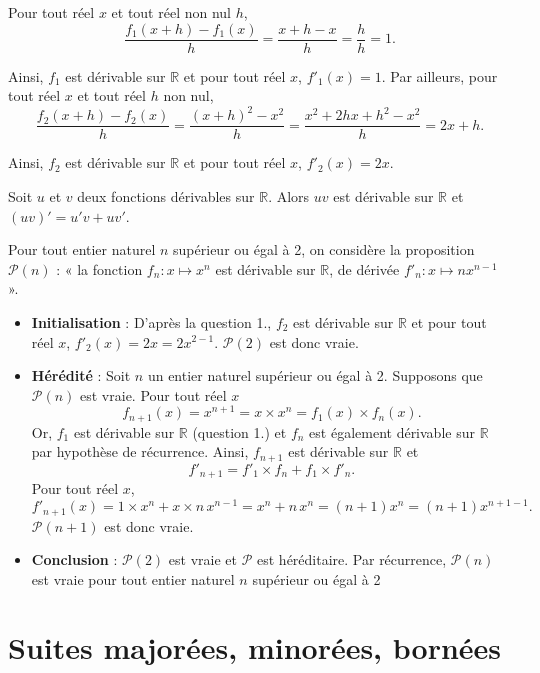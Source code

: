 \documentclass[11pt,fleqn]{book} %
\begin{document}
\begin{solution} Pour tout réel \(x\) et tout réel non nul \(h\),
\[ \dfrac{f_1(x+h) - f_1(x)}{h}=\dfrac{x+h-x}{h} = \dfrac{h}{h}=1.\]

Ainsi, \(f_1\) est dérivable sur \(\mathbb{R}\) et pour tout réel \(x\), \(f'_1(x)=1\). Par ailleurs, pour tout réel \(x\) et tout réel \(h\) non nul,
\[\dfrac{f_2(x+h)-f_2(x)}{h}=\dfrac{(x+h)^2-x^2}{h}=\dfrac{x^2+2hx+h^2-x^2}{h}=2x+h.\]

Ainsi, \(f_2\) est dérivable sur \(\mathbb{R}\) et pour tout réel \(x\), \(f'_2(x)=2x\).

Soit \(u\) et \(v\) deux fonctions dérivables sur \(\mathbb{R}\). Alors \(uv\) est dérivable sur \(\mathbb{R}\) et \((uv)'=u'v+uv'\).

Pour tout entier naturel \(n\) supérieur ou égal à 2, on considère la proposition \( \mathcal{P}(n)\) : « la fonction \(f_n : x \mapsto x^n\) est dérivable sur \(\mathbb{R}\), de dérivée \(f'_n : x \mapsto nx^{n-1}\) ».
\begin{itemize} \item \textbf{Initialisation} : D'après la question 1., \(f_2\) est dérivable sur \(\mathbb{R}\) et pour tout réel \(x\), \(f'_2(x)=2x=2x^{2-1}\). \(\mathcal{P}(2)\) est donc vraie.
\item \textbf{Hérédité} : Soit \(n\) un entier naturel supérieur ou égal à 2. Supposons que \( \mathcal{P}(n)\) est vraie. Pour tout réel \(x\)\[ f_{n+1}(x) = x^{n+1} = x \times x^n = f_1(x) \times f_n(x) .\]
Or, \(f_1\) est dérivable sur \(\mathbb{R}\) (question 1.) et \(f_n\) est également dérivable sur \(\mathbb{R}\) par hypothèse de récurrence. Ainsi, \(f_{n+1}\) est dérivable sur \(\mathbb{R}\) et
\[f'_{n+1}=f'_1 \times f_n + f_1 \times f'_n.\]
Pour tout réel \(x\),
\[ f'_{n+1}(x)= 1 \times x^n + x \times n\,x^{n-1} = x^n+n\,x^n=(n+1)x^n=(n+1) x^{n+1-1}.\]
\(\mathcal{P}(n+1)\) est donc vraie.
\item \textbf{Conclusion} : \(\mathcal{P}(2)\) est vraie et \(\mathcal{P}\) est héréditaire. Par récurrence, \(\mathcal{P}(n)\) est vraie pour tout entier naturel \(n\) supérieur ou égal à 2\end{itemize}\end{solution}


\section*{Suites majorées, minorées, bornées}
\end{document}
